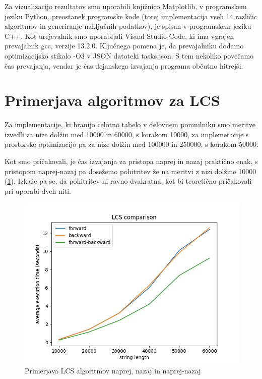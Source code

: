 \documentclass[a4paper,12pt,openright]{book}
\begin{document}
Za vizualizacijo rezultatov smo uporabili knjižnico Matplotlib, v programskem jeziku Python, preostanek programske kode (torej implementacija vseh 14 različic algoritmov in generiranje naključnih podatkov), je spisan v programskem jeziku C++. Kot urejevalnik smo uporabljali Visual Studio Code, ki ima vgrajen prevajalnik gcc, verzije 13.2.0. Ključnega pomena je, da prevajalniku dodamo optimizacijsko stikalo -O3 \cite{compilerFlag} v JSON datoteki tasks.json. S tem nekoliko povečamo čas prevajanja, vendar je čas dejanskega izvajanja programa občutno hitrejši. 




\section{Primerjava algoritmov za LCS}

Za implementacije, ki hranijo celotno tabelo v delovnem pomnilniku smo meritve izvedli za nize dolžin med 10000 in 60000, s korakom 10000, za implemetacije s prostorsko optimizacijo pa za nize dolžin med 100000 in 250000, s korakom 50000. 

Kot smo pričakovali, je čas izvajanja za pristopa naprej in nazaj praktično enak, s pristopom naprej-nazaj pa dosežemo pohitritev že na meritvi z nizi dolžine 10000 (\ref{comparison1}). Izkaže pa se, da pohitritev ni ravno dvakratna, kot bi teoretično pričakovali pri uporabi dveh niti. 


\begin{figure}[htb]
\begin{center}
\includegraphics[width=1.0\textwidth]{plots/LCS_comparison.png}
\end{center}
\caption{Primerjava LCS algoritmov naprej, nazaj in naprej-nazaj}
\label{comparison1}
\end{figure}
\end{document}
